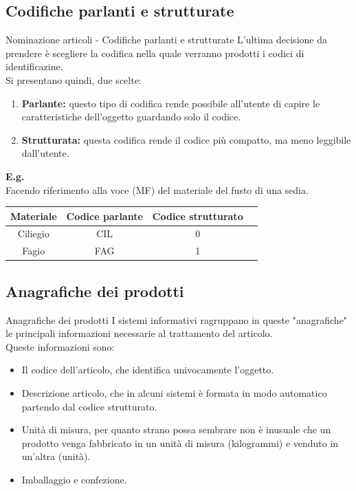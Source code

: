 \documentclass{beamer}
\begin{document}
\subsection{Codifiche parlanti e strutturate}
\begin{frame}{Nominazione articoli - Codifiche parlanti e strutturate}
    L'ultima decisione da prendere è scegliere la codifica nella quale verranno prodotti i codici di identificazine.\\
    Si presentano quindi, due scelte:
    \begin{enumerate}
        \item \textbf{Parlante:} questo tipo di codifica rende possibile all'utente di capire le caratteristiche dell'oggetto guardando solo il codice.
        \item \textbf{Strutturata:} questa codifica rende il codice più compatto, ma meno leggibile dall'utente.
    \end{enumerate}
    \textbf{E.g.}\\
    Facendo riferimento alla voce (MF) del materiale del fusto di una sedia.
    \begin{center}
        \begin{tabular}{|c|c|c|c|}
            \hline
            \textbf{Materiale} & \textbf{Codice parlante} & \textbf{Codice strutturato} \\
            \hline
            Ciliegio           & CIL                      & 0                           \\
            \hline
            Fagio              & FAG                      & 1                           \\
            \hline
        \end{tabular}
    \end{center}
\end{frame}

\subsection{Anagrafiche dei prodotti}
\begin{frame}{Anagrafiche dei prodotti}
    I sistemi informativi ragruppano in queste "anagrafiche" le principali informazioni necessarie al trattamento del articolo.\\
    Queste informazioni sono:
    \begin{itemize}
        \item Il codice dell'articolo, che identifica univocamente l'oggetto.
        \item Descrizione articolo, che in alcuni sistemi è formata in modo automatico partendo dal codice strutturato.
        \item Unità di misura, per quanto strano possa sembrare non è inusuale che un prodotto venga fabbricato in un unità di misura (kilogrammi) e venduto in un'altra (unità).
        \item Imballaggio e confezione.
    \end{itemize}
\end{frame}
\end{document}
